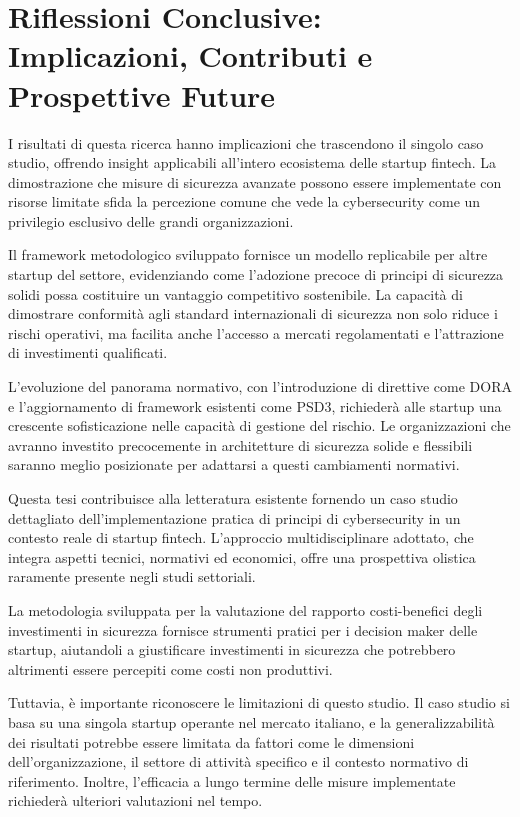 \section{Riflessioni Conclusive: Implicazioni, Contributi e Prospettive Future}

I risultati di questa ricerca hanno implicazioni che trascendono il singolo caso studio, offrendo insight applicabili all'intero ecosistema delle startup fintech. La dimostrazione che misure di sicurezza avanzate possono essere implementate con risorse limitate sfida la percezione comune che vede la cybersecurity come un privilegio esclusivo delle grandi organizzazioni.

Il framework metodologico sviluppato fornisce un modello replicabile per altre startup del settore, evidenziando come l'adozione precoce di principi di sicurezza solidi possa costituire un vantaggio competitivo sostenibile. La capacità di dimostrare conformità agli standard internazionali di sicurezza non solo riduce i rischi operativi, ma facilita anche l'accesso a mercati regolamentati e l'attrazione di investimenti qualificati.

L'evoluzione del panorama normativo, con l'introduzione di direttive come DORA e l'aggiornamento di framework esistenti come PSD3, richiederà alle startup una crescente sofisticazione nelle capacità di gestione del rischio. Le organizzazioni che avranno investito precocemente in architetture di sicurezza solide e flessibili saranno meglio posizionate per adattarsi a questi cambiamenti normativi.

Questa tesi contribuisce alla letteratura esistente fornendo un caso studio dettagliato dell'implementazione pratica di principi di cybersecurity in un contesto reale di startup fintech. L'approccio multidisciplinare adottato, che integra aspetti tecnici, normativi ed economici, offre una prospettiva olistica raramente presente negli studi settoriali.

La metodologia sviluppata per la valutazione del rapporto costi-benefici degli investimenti in sicurezza fornisce strumenti pratici per i decision maker delle startup, aiutandoli a giustificare investimenti in sicurezza che potrebbero altrimenti essere percepiti come costi non produttivi.

Tuttavia, è importante riconoscere le limitazioni di questo studio. Il caso studio si basa su una singola startup operante nel mercato italiano, e la generalizzabilità dei risultati potrebbe essere limitata da fattori come le dimensioni dell'organizzazione, il settore di attività specifico e il contesto normativo di riferimento. Inoltre, l'efficacia a lungo termine delle misure implementate richiederà ulteriori valutazioni nel tempo.

